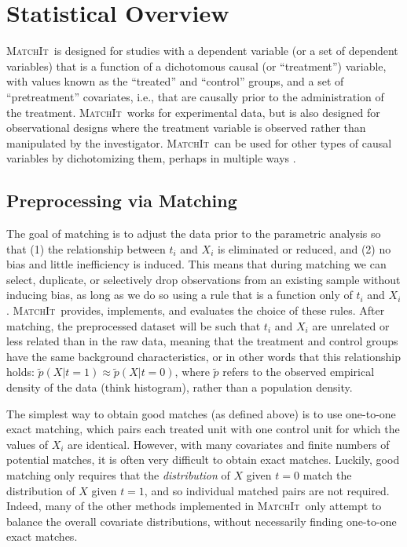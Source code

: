 \documentclass[oneside,letterpaper,titlepage]{article}
\newcommand{\MatchIt}{\textsc{MatchIt}}
\begin{document}

\section{Statistical Overview}

\MatchIt\ is designed for studies with a dependent variable (or a set
of dependent variables) that is a function of a dichotomous causal (or
``treatment'') variable, with values known as the ``treated'' and
``control'' groups, and a set of ``pretreatment'' covariates, i.e.,
that are causally prior to the administration of the treatment.
\MatchIt\ works for experimental data, but is also designed for
observational designs where the treatment variable is observed rather
than manipulated by the investigator.  \MatchIt\ can be used for other
types of causal variables by dichotomizing them, perhaps in multiple
ways \citep[see also][]{ImaDyk04}.

\subsection{Preprocessing via Matching}

The goal of matching is to adjust the data prior to the parametric
analysis so that (1) the relationship between $t_i$ and $X_i$ is
eliminated or reduced, and (2) no bias and little inefficiency is
induced.  This means that during matching we can select, duplicate, or
selectively drop observations from an existing sample without inducing
bias, as long as we do so using a rule that is a function only of
$t_i$ and $X_i$.  \MatchIt\ provides, implements, and evaluates the
choice of these rules.  After matching, the preprocessed dataset will
be such that $t_i$ and $X_i$ are unrelated or less related than in the
raw data, meaning that the treatment and control groups have the same
background characteristics, or in other words that this relationship
holds: $\tilde p(X|t=1) \approx \tilde p(X|t=0)$, where $\tilde p$
refers to the observed empirical density of the data (think
histogram), rather than a population density.  

The simplest way to obtain good matches (as defined above) is to use one-to-one exact matching,
which pairs each treated unit with one control unit for which the
values of $X_i$ are identical.  However, with many covariates and finite numbers of
potential matches, it is often very difficult to obtain exact matches.  Luckily, good matching only requires that
the \emph{distribution} of $X$ given $t=0$ match the distribution of
$X$ given $t=1$, and so individual matched pairs are not required.
Indeed, many of the other methods implemented in \MatchIt\ only
attempt to balance the overall covariate distributions, without necessarily finding one-to-one exact matches.
\end{document}
